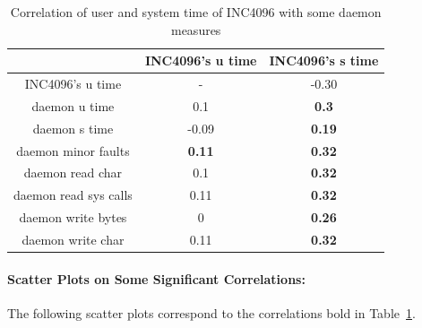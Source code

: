 \begin{table}[h]
\begin{center}
\begin{tabular}{|c|c|c|} \hline
 						   & INC4096's u time & INC4096's s time\\ \hline
INC4096's u time  &	 -  & -0.30 \\ \hline					
daemon u time & 0.1 & {\bf 0.3} \\ \hline
daemon s time & -0.09 & {\bf 0.19} \\ \hline
daemon minor faults & {\bf 0.11} & {\bf 0.32} \\ \hline
daemon read char & 0.1 & {\bf 0.32} \\ \hline
daemon read sys calls & 0.11 & {\bf 0.32} \\ \hline
daemon write bytes & 0 & {\bf 0.26} \\ \hline
daemon write char & 0.11 & {\bf 0.32}\\ \hline
\end{tabular}
\end{center}
\vspace{-.2in}
\caption{Correlation of user and system time of INC4096 with some daemon measures\label{tab:corr_table}}
\end{table}

\clearpage
\newpage

\paragraph{Scatter Plots on Some Significant Correlations:} 
The following scatter plots correspond to the correlations bold in Table~\ref{tab:corr_table}.


